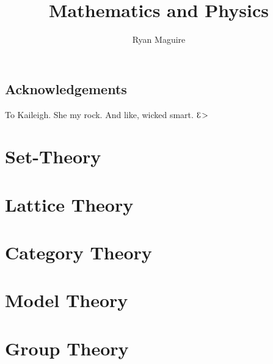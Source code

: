 \documentclass[oneside]{book}                                                  %
\title{Mathematics and Physics}                                                %
\author{Ryan Maguire}                                                          %
\date{\vspace{-5ex}}                                                           %
\newcommand*{\TOPPATH}{books}
\newcommand*{\PATH}{\TOPPATH/}
\newcounter{endpage}
\begin{document}
    \maketitle
    \tableofcontents
    \listoffigures
    \listoftables
    \clearpage
    \chapter*{Acknowledgements}
        To Kaileigh. She my rock. And like, wicked smart. $\reflectbox{3}\!>$
        \label{book:Foundations}
        \renewcommand{\PATH}{\TOPPATH/Foundations}
        \part{Set-Theory}
            
        \part{Lattice Theory}
            
        \part{Category Theory}
            
        \part{Model Theory}
            
    \clearpage

    \setcounter{endpage}{\thepage}
        \label{book:Algebra}%
        \renewcommand{\PATH}{\TOPPATH/Algebra}
        \setcounter{page}{\value{endpage}}
        \part{Group Theory}
            
    \clearpage
\end{document}

